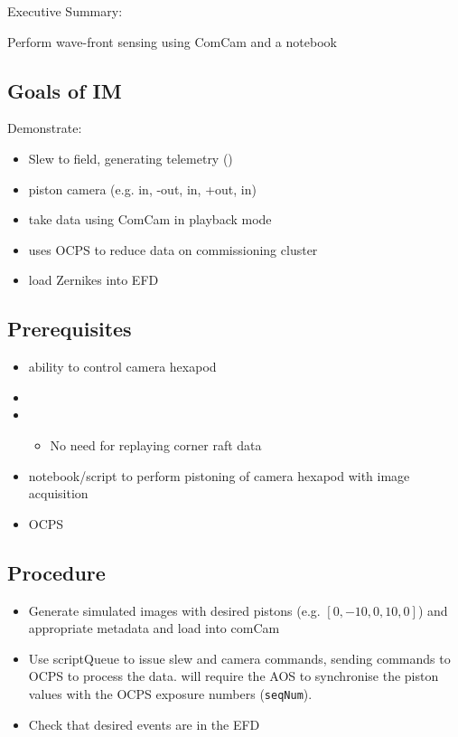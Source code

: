 
Executive Summary:

Perform wave-front sensing using ComCam and a notebook

\subsection{Goals of IM}
Demonstrate:
\begin{itemize}
\item Slew to field, generating telemetry (\cf {})
\item piston camera (e.g. in, -out, in, +out, in)
\item take data using ComCam in playback mode
\item uses \gls{OCPS} to reduce data on commissioning cluster
\item load Zernikes into \gls{EFD}
\end{itemize}

\subsection{Prerequisites}
\begin{itemize}
\item ability to control camera hexapod
\item {}
\item {}
  \begin{itemize}
  \item No need for replaying corner raft data
  \end{itemize}
\item notebook/script to perform pistoning of camera hexapod with image acquisition
\item \gls{OCPS}
\end{itemize}

\subsection{Procedure}
\begin{itemize}
\item Generate simulated images with desired pistons (e.g. $[0, -10, 0, 10, 0]$) and appropriate
  metadata and load into comCam
\item Use \gls{scriptQueue} to issue slew and camera commands, sending commands to \gls{OCPS}
      to process the data.  \Nb will require the \gls{AOS} to synchronise the piston values
      with the OCPS exposure numbers (\texttt{seqNum}).
\item Check that desired events are in the EFD
\end{itemize}
